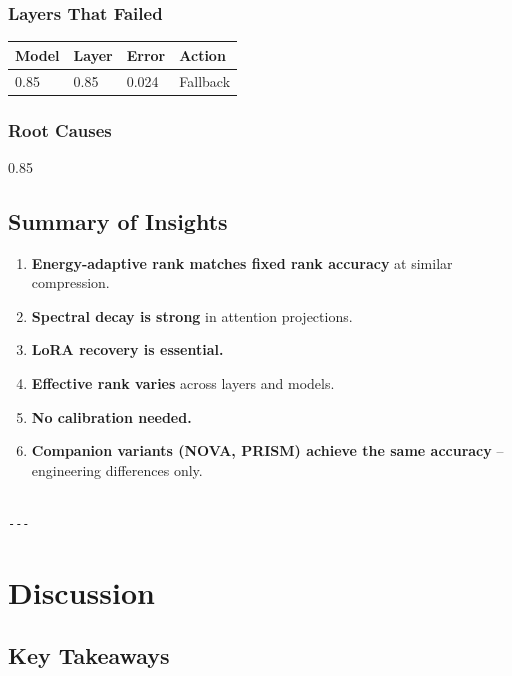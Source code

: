 \subsubsection{Layers That Failed}

\begin{table}[H]
\centering
\small
\begin{tabular}{llll}
\toprule
\textbf{Model} & \textbf{Layer} & \textbf{Error} & \textbf{Action} \\
\midrule
0.85 & 0.85 & 0.024 & Fallback \\
\bottomrule
\end{tabular}
\end{table}

\subsubsection{Root Causes}

0.85

\subsection{Summary of Insights}

\begin{enumerate}
\item \textbf{Energy-adaptive rank matches fixed rank accuracy} at similar compression.
\item \textbf{Spectral decay is strong} in attention projections.
\item \textbf{LoRA recovery is essential.}
\item \textbf{Effective rank varies} across layers and models.
\item \textbf{No calibration needed.}
\item \textbf{Companion variants (NOVA, PRISM) achieve the same accuracy} --
  engineering differences only.
\end{enumerate}
\begin{lstlisting}

---
\end{lstlisting}


\section{Discussion}

\subsection{Key Takeaways}


